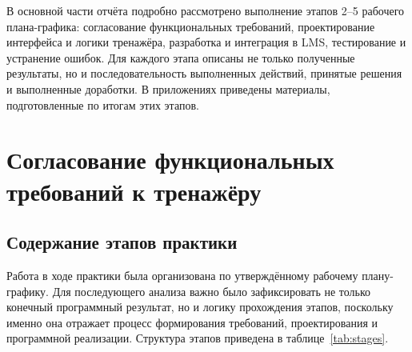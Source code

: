 \documentclass[a4paper,12pt]{extarticle}
\begin{document}
В основной части отчёта подробно рассмотрено выполнение этапов 2--5 рабочего плана-графика: согласование функциональных требований, проектирование интерфейса и логики тренажёра, разработка и интеграция в LMS, тестирование и устранение ошибок. Для каждого этапа описаны не только полученные результаты, но и последовательность выполненных действий, принятые решения и выполненные доработки. В приложениях приведены материалы, подготовленные по итогам этих этапов.

\section{Согласование функциональных требований к тренажёру}

\subsection{Содержание этапов практики}

Работа в ходе практики была организована по утверждённому рабочему плану-графику. Для последующего анализа важно было зафиксировать не только конечный программный результат, но и логику прохождения этапов, поскольку именно она отражает процесс формирования требований, проектирования и программной реализации. Структура этапов приведена в таблице~\ref{tab:stages}.
\end{document}
